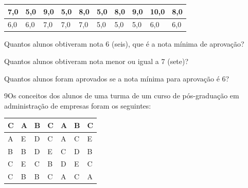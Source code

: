 \begin{longtable}[]{@{}llllllllll@{}}
\toprule
7,0 & 5,0 & 9,0 & 5,0 & 8,0 & 5,0 & 8,0 & 9,0 & 10,0 &
8,0\tabularnewline
\midrule
\endhead
6,0 & 6,0 & 7,0 & 7,0 & 7,0 & 5,0 & 5,0 & 5,0 & 6,0 & 6,0\tabularnewline
\bottomrule
\end{longtable}

\begin{escolha}
\item
  Quantos alunos obtiveram nota 6 (seis), que é a nota mínima de aprovação?
\item{}
\item\reduline{\mbox{}\hfill}

\item\reduline{\mbox{}\hfill}

\item
  Quantos alunos obtiveram nota menor ou igual a 7 (sete)?
\item{}
\item\reduline{\mbox{}\hfill}
\item\reduline{\mbox{}\hfill}

\item
  Quantos alunos foram aprovados se a nota mínima para aprovação é 6?
\item{}
\item\reduline{\mbox{}\hfill}
\item\reduline{\mbox{}\hfill}
\end{escolha}

\pagebreak

\num{9}Os conceitos dos alunos de uma turma de um curso de pós-graduação
em administração de empresas foram os seguintes:

\begin{longtable}[]{@{}lllllll@{}}
\toprule
C & A & B & C & A & B & C\tabularnewline
\midrule
\endhead
A & E & D & C & A & C & E\tabularnewline
B & B & D & E & C & D & B\tabularnewline
C & E & C & B & D & E & C\tabularnewline
C & B & B & C & A & C & A\tabularnewline
\bottomrule
\end{longtable}

